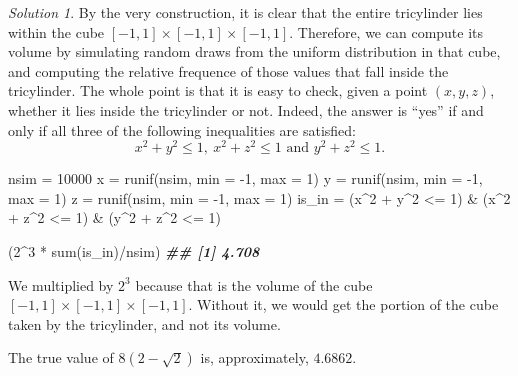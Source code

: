 \documentclass[
]{book}
\newenvironment{Shaded}{\begin{snugshade}}{\end{snugshade}}
\newcommand{\AttributeTok}[1]{\textcolor[rgb]{0.77,0.63,0.00}{#1}}
\newcommand{\DecValTok}[1]{\textcolor[rgb]{0.00,0.00,0.81}{#1}}
\newcommand{\DocumentationTok}[1]{\textcolor[rgb]{0.56,0.35,0.01}{\textbf{\textit{#1}}}}
\newcommand{\FunctionTok}[1]{\textcolor[rgb]{0.00,0.00,0.00}{#1}}
\newcommand{\NormalTok}[1]{#1}
\newcommand{\OtherTok}[1]{\textcolor[rgb]{0.56,0.35,0.01}{#1}}
\newcommand{\SpecialCharTok}[1]{\textcolor[rgb]{0.00,0.00,0.00}{#1}}
\theoremstyle{definition}
\theoremstyle{definition}
\theoremstyle{definition}
\theoremstyle{definition}
\theoremstyle{remark}
\newtheorem*{solution}{Solution}
\begin{document}
\begin{solution}
By the very construction, it is clear that the entire tricylinder lies
within the cube \([-1,1]\times [-1,1] \times[-1,1]\). Therefore, we can
compute its volume by simulating random draws from the uniform
distribution in that cube, and computing the relative frequence of
those values that fall inside the tricylinder. The whole point is
that it is easy to check, given a point \((x,y,z)\), whether it lies
inside the tricylinder or not. Indeed, the answer is ``yes'' if and
only if all three of the following inequalities are satisfied: \[
x^2+y^2 \le 1,\  x^2+z^2\leq 1 \text{ and } y^2+z^2\leq 1.\]

\begin{Shaded}
\begin{Highlighting}[]
\NormalTok{nsim }\OtherTok{=} \DecValTok{10000}
\NormalTok{x }\OtherTok{=} \FunctionTok{runif}\NormalTok{(nsim, }\AttributeTok{min =} \SpecialCharTok{{-}}\DecValTok{1}\NormalTok{, }\AttributeTok{max =} \DecValTok{1}\NormalTok{)}
\NormalTok{y }\OtherTok{=} \FunctionTok{runif}\NormalTok{(nsim, }\AttributeTok{min =} \SpecialCharTok{{-}}\DecValTok{1}\NormalTok{, }\AttributeTok{max =} \DecValTok{1}\NormalTok{)}
\NormalTok{z }\OtherTok{=} \FunctionTok{runif}\NormalTok{(nsim, }\AttributeTok{min =} \SpecialCharTok{{-}}\DecValTok{1}\NormalTok{, }\AttributeTok{max =} \DecValTok{1}\NormalTok{)}
\NormalTok{is\_in }\OtherTok{=}\NormalTok{ (x}\SpecialCharTok{\^{}}\DecValTok{2} \SpecialCharTok{+}\NormalTok{ y}\SpecialCharTok{\^{}}\DecValTok{2} \SpecialCharTok{\textless{}=} \DecValTok{1}\NormalTok{) }\SpecialCharTok{\&}\NormalTok{ (x}\SpecialCharTok{\^{}}\DecValTok{2} \SpecialCharTok{+}\NormalTok{ z}\SpecialCharTok{\^{}}\DecValTok{2} \SpecialCharTok{\textless{}=} \DecValTok{1}\NormalTok{) }\SpecialCharTok{\&}\NormalTok{ (y}\SpecialCharTok{\^{}}\DecValTok{2} \SpecialCharTok{+}\NormalTok{ z}\SpecialCharTok{\^{}}\DecValTok{2} \SpecialCharTok{\textless{}=} \DecValTok{1}\NormalTok{)}

\NormalTok{(}\DecValTok{2}\SpecialCharTok{\^{}}\DecValTok{3} \SpecialCharTok{*} \FunctionTok{sum}\NormalTok{(is\_in)}\SpecialCharTok{/}\NormalTok{nsim)}
\DocumentationTok{\#\# [1] 4.708}
\end{Highlighting}
\end{Shaded}

We multiplied by \(2^3\) because that is the volume of the cube
\([-1,1]\times [-1,1] \times [-1,1]\). Without it, we would get the
portion of the cube taken by the tricylinder, and not its volume.

The true value of \(8(2-\sqrt{2})\) is, approximately, \(4.6862\).
\end{solution}
\end{document}
